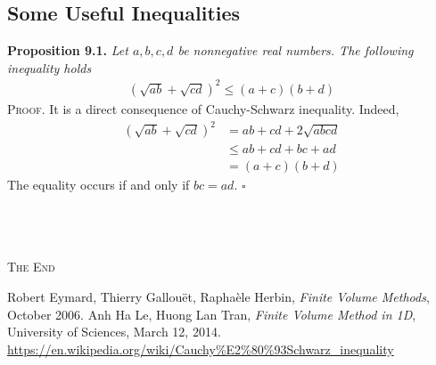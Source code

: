 \documentclass[a4paper]{article}
\numberwithin{equation}{section}
\begin{document}
\subsection{Some Useful Inequalities}
\textbf{Proposition 9.1.} \textit{Let $a,b,c,d$ be nonnegative real numbers. The following inequality holds}
\begin{align}
\label{6.6}
{\left( {\sqrt {ab}  + \sqrt {cd} } \right)^2} \le \left( {a + c} \right)\left( {b + d} \right)
\end{align}
\textsc{Proof.} It is a direct consequence of Cauchy-Schwarz inequality. Indeed,
\begin{align}
{\left( {\sqrt {ab}  + \sqrt {cd} } \right)^2} &= ab + cd + 2\sqrt {abcd} \\
& \le ab + cd + bc + ad\\
& = \left( {a + c} \right)\left( {b + d} \right)
\end{align}
The equality occurs if and only if $bc=ad$. \hfill $\square$\\
\\
\\
\\
\begin{center}
\textsc{The End}
\end{center}
\newpage
\printindex
\newpage
\begin{thebibliography}{999}
 Robert Eymard, Thierry Gallou\"{e}t, Rapha\`{e}le Herbin, \textit{Finite Volume Methods}, October 2006.
 Anh Ha Le, Huong Lan Tran, \textit{Finite Volume Method in 1D}, University of Sciences, March 12, 2014.
 \url{https://en.wikipedia.org/wiki/Cauchy%E2%80%93Schwarz_inequality}
\end{thebibliography}
\end{document}

